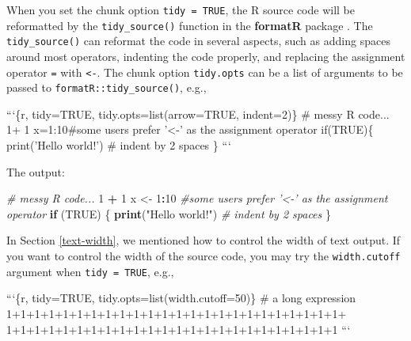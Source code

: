 \documentclass[
  11pt,
]{krantz}
\newenvironment{Shaded}{\begin{snugshade}}{\end{snugshade}}
\newcommand{\BaseNTok}[1]{\textcolor[rgb]{0.06,0.06,0.06}{#1}}
\newcommand{\CommentTok}[1]{\textcolor[rgb]{0.37,0.37,0.37}{\textit{#1}}}
\newcommand{\ControlFlowTok}[1]{\textcolor[rgb]{0.27,0.27,0.27}{\textbf{#1}}}
\newcommand{\DecValTok}[1]{\textcolor[rgb]{0.06,0.06,0.06}{#1}}
\newcommand{\KeywordTok}[1]{\textcolor[rgb]{0.27,0.27,0.27}{\textbf{#1}}}
\newcommand{\NormalTok}[1]{#1}
\newcommand{\OperatorTok}[1]{\textcolor[rgb]{0.43,0.43,0.43}{\textbf{#1}}}
\newcommand{\OtherTok}[1]{\textcolor[rgb]{0.37,0.37,0.37}{#1}}
\newcommand{\StringTok}[1]{\textcolor[rgb]{0.5,0.5,0.5}{#1}}
\begin{document}
When you set the chunk option \texttt{tidy\ =\ TRUE}, the R source code will be reformatted by the \texttt{tidy\_source()} function in the \textbf{formatR} package \citep{R-formatR}. The \texttt{tidy\_source()} can reformat the code in several aspects, such as adding spaces around most operators, indenting the code properly, and replacing the assignment operator \texttt{=} with \texttt{\textless{}-}. The chunk option \texttt{tidy.opts} can be a list of arguments to be passed to \texttt{formatR::tidy\_source()}, e.g.,

\begin{Shaded}
\begin{Highlighting}[]
\BaseNTok{```\{r, tidy=TRUE, tidy.opts=list(arrow=TRUE, indent=2)\}}
\BaseNTok{# messy R code...}
\BaseNTok{1+            1}
\BaseNTok{x=1:10#some users prefer '<-' as the assignment operator}
\BaseNTok{if(TRUE)\{}
\BaseNTok{print('Hello world!') # indent by 2 spaces}
\BaseNTok{\}}
\BaseNTok{```}
\end{Highlighting}
\end{Shaded}

The output:

\begin{Shaded}
\begin{Highlighting}[]
\CommentTok{# messy R code...}
\DecValTok{1} \OperatorTok{+}\StringTok{ }\DecValTok{1}
\NormalTok{x <-}\StringTok{ }\DecValTok{1}\OperatorTok{:}\DecValTok{10}  \CommentTok{#some users prefer '<-' as the assignment operator}
\ControlFlowTok{if}\NormalTok{ (}\OtherTok{TRUE}\NormalTok{) \{}
  \KeywordTok{print}\NormalTok{(}\StringTok{"Hello world!"}\NormalTok{)  }\CommentTok{# indent by 2 spaces}
\NormalTok{\}}
\end{Highlighting}
\end{Shaded}

In Section \ref{text-width}, we mentioned how to control the width of text output. If you want to control the width of the source code, you may try the \texttt{width.cutoff} argument when \texttt{tidy\ =\ TRUE}, e.g.,

\begin{Shaded}
\begin{Highlighting}[]
\BaseNTok{```\{r, tidy=TRUE, tidy.opts=list(width.cutoff=50)\}}
\BaseNTok{# a long expression}
\BaseNTok{1+1+1+1+1+1+1+1+1+1+1+1+1+1+1+1+1+1+1+1+1+1+1+1+}
\BaseNTok{1+1+1+1+1+1+1+1+1+1+1+1+1+1+1+1+1+1+1+1+1+1+1+1}
\BaseNTok{```}
\end{Highlighting}
\end{Shaded}
\end{document}
